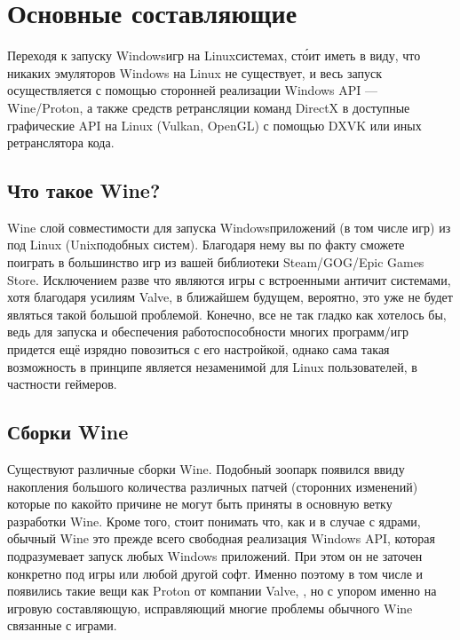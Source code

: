 \documentclass[letterpaper,10pt,russian,openany]{sphinxmanual}
\begin{document}
\section{Основные составляющие}
\label{\detokenize{source/linux-gaming:main-components}}\label{\detokenize{source/linux-gaming:index-0}}\label{\detokenize{source/linux-gaming:id1}}
\sphinxAtStartPar
Переходя к запуску Windows\sphinxhyphen{}игр на Linux\sphinxhyphen{}системах, сто́ит иметь в виду, что никаких эмуляторов Windows на Linux не существует,
и весь запуск осуществляется с помощью сторонней реализации Windows API — Wine/Proton,
а также средств ретрансляции команд DirectX в доступные графические API на Linux (Vulkan, OpenGL) с помощью DXVK или иных ретранслятора кода.

\ignorespaces 

\subsection{Что такое Wine?}
\label{\detokenize{source/linux-gaming:wine}}\label{\detokenize{source/linux-gaming:about-wine}}\label{\detokenize{source/linux-gaming:index-1}}
\sphinxAtStartPar
Wine \sphinxhyphen{} слой совместимости для запуска Windows\sphinxhyphen{}приложений (в том числе игр) из под Linux (Unix\sphinxhyphen{}подобных систем).
Благодаря нему вы по факту сможете поиграть в большинство игр из вашей библиотеки Steam/GOG/Epic Games Store.
Исключением разве что являются игры с встроенными анти\sphinxhyphen{}чит системами, хотя благодаря усилиям Valve,
в ближайшем будущем, вероятно, это уже не будет являться такой большой проблемой.
Конечно, все не так гладко как хотелось бы, ведь для запуска и обеспечения работоспособности многих программ/игр придется ещё изрядно повозиться с его настройкой,
однако сама такая возможность в принципе является незаменимой для Linux пользователей, в частности геймеров.

\ignorespaces 

\subsection{Сборки Wine}
\label{\detokenize{source/linux-gaming:wine-builds}}\label{\detokenize{source/linux-gaming:index-2}}\label{\detokenize{source/linux-gaming:id2}}
\sphinxAtStartPar
Существуют различные сборки Wine.
Подобный зоопарк появился ввиду накопления большого количества различных патчей (сторонних изменений)
которые по какой\sphinxhyphen{}то причине не могут быть приняты в основную ветку разработки Wine.
Кроме того, стоит понимать что, как и в случае с ядрами, обычный Wine это прежде всего свободная реализация Windows API,
которая подразумевает запуск любых Windows приложений. При этом он не заточен конкретно под игры или любой другой софт.
Именно поэтому в том числе и появились такие вещи как Proton от компании Valve,
, но с упором именно на игровую составляющую, исправляющий
многие проблемы обычного Wine связанные с играми.
\end{document}
